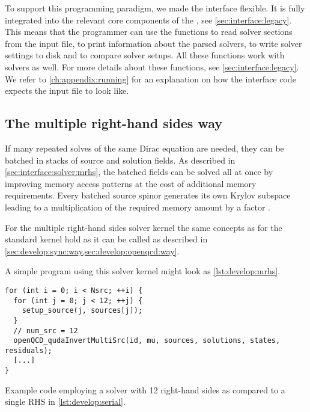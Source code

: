 To support this programming paradigm, we made the interface flexible. %
It is fully integrated into the relevant core components of the \openqxd, see \cref{sec:interface:legacy}.
This means that the programmer can use the functions  to read solver sections from the input file,  to print information about the parsed solvers,  to write solver settings to disk and  to compare solver setups.
All these functions work with \quda solvers as well.
For more details about these functions, see \cref{sec:interface:legacy}.
We refer to \cref{ch:appendix:running} for an explanation on how the \quda interface code expects the input file to look like.

\subsection{The multiple right-hand sides way}
\label{sec:develop:mrhs:way}

If many repeated solves of the same Dirac equation are needed, they can be batched in stacks of  source and solution fields.
As described in \cref{sec:interface:solver:mrhs}, the batched fields can be solved all at once by improving memory access patterns at the cost of additional memory requirements.
Every batched source spinor generates its own Krylov subspace leading to a multiplication of the required memory amount by a factor .

For the multiple right-hand sides solver kernel the same concepts as for the standard kernel hold as it can be called as described in \cref{sec:develop:sync:way,sec:develop:openqcd:way}.

A simple program using this solver kernel might look as \cref{lst:develop:mrhs}.
\begin{codelisting}
\begin{verbatim}
for (int i = 0; i < Nsrc; ++i) {
  for (int j = 0; j < 12; ++j) {
    setup_source(j, sources[j]);
  }
  // num_src = 12
  openQCD_qudaInvertMultiSrc(id, mu, sources, solutions, states, residuals);
  [...]
}
\end{verbatim}
\caption{Example code employing a solver with \num{12} right-hand sides as compared to a single RHS in \cref{lst:develop:serial}.}
\label{lst:develop:mrhs}
\end{codelisting}


